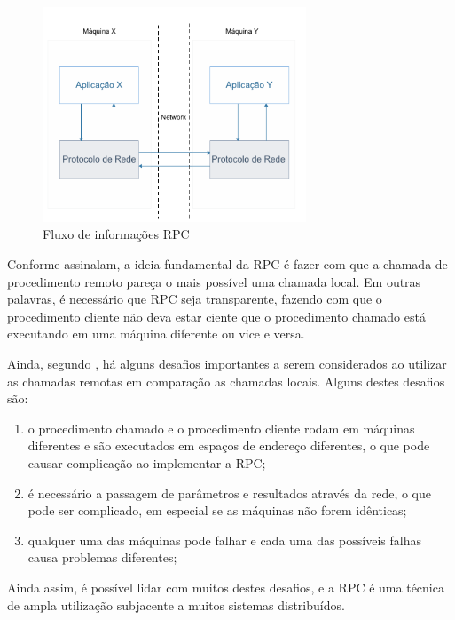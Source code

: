 \begin{figure}
    \centering
    \includegraphics[width=0.7\textwidth]{figuras/rpc.png}
    \caption{Fluxo de informações RPC}
    \label{fig:rpc}
\end{figure}

Conforme  assinalam, a ideia fundamental da RPC é fazer com que a chamada de procedimento remoto pareça o mais possível uma chamada local. Em outras palavras, é necessário que RPC seja transparente, fazendo com que o procedimento cliente não deva estar ciente que o procedimento chamado está executando em uma máquina diferente ou vice e versa.

Ainda, segundo , há alguns desafios importantes a serem considerados ao utilizar as chamadas remotas em comparação as chamadas locais. Alguns destes desafios são:

\begin{enumerate}[label=\alph*)]
    \item o procedimento chamado e o procedimento cliente rodam em máquinas diferentes e são executados em espaços de endereço diferentes, o que pode causar complicação ao implementar a RPC; 

\item é necessário a passagem de parâmetros e resultados através da rede, o que pode ser complicado, em especial se as máquinas não forem idênticas;

\item qualquer uma das máquinas pode falhar e cada uma das possíveis falhas causa problemas diferentes;

\end{enumerate}

Ainda assim, é possível lidar com muitos destes desafios, e a RPC é uma técnica de ampla utilização subjacente a muitos sistemas distribuídos.

